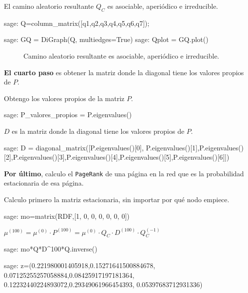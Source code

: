 \par El camino aleatorio resultante $Q_C$ es asociable, aperiódico e irreducible.

\begin{sagecommandline}
    sage: Q=column_matrix([q1,q2,q3,q4,q5,q6,q7]);
\end{sagecommandline}

\begin{sagecommandline}
    sage: GQ = DiGraph(Q, multiedges=True)
    sage: Qplot = GQ.plot()
\end{sagecommandline}
\begin{figure}[H]
    \centering
    \label{caminoZ}
    \caption{Camino aleatorio resultante es asociable, aperiódico e irreducible.}
\end{figure}

\par \textbf{El cuarto paso} es obtener la matriz donde la diagonal tiene los valores propios de $P$.
\par Obtengo los valores propios de la matriz $P$.
\begin{sagecommandline}
    sage: P_valores_propios = P.eigenvalues()
\end{sagecommandline}

\par $D$ es la matriz donde la diagonal tiene los valores propios de $P$.
\begin{sagecommandline}
    sage: D = diagonal_matrix([P.eigenvalues()[0], P.eigenvalues()[1],P.eigenvalues()[2],P.eigenvalues()[3],P.eigenvalues()[4],P.eigenvalues()[5],P.eigenvalues()[6]])
\end{sagecommandline}

\par \textbf{Por último}, calculo el \texttt{PageRank} de una página en la red que es la probabilidad estacionaria de esa página.
\par Calculo primero la matriz estacionaria, sin importar por qué nodo empiece.
\begin{sagecommandline}
    sage: mo=matrix(RDF,[1, 0, 0, 0, 0, 0, 0])
\end{sagecommandline}

\par $\mu^{(100)} = \mu^{(0)} \cdot P^{(100)} = \mu^{(0)} \cdot Q_C \cdot D^{(100)} \cdot Q_C^{(-1)}$
\begin{sagecommandline}
    sage: mo*Q*D^100*Q.inverse()
\end{sagecommandline}
\begin{sagecommandline}
    sage: z=(0.221980001405918,0.15271641500884678, 0.07125255257058884,0.08425917197181364, 0.12232440224893072,0.29349061966454393, 0.05397683712931336)
\end{sagecommandline}

